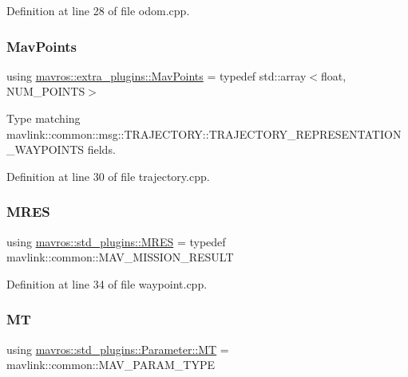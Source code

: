 Definition at line 28 of file odom.\+cpp.

\mbox{\label{group__plugin_gafae91f0662f199848c074fd4d2edd106}} 
\subsubsection{\texorpdfstring{MavPoints}{MavPoints}}
{\footnotesize\ttfamily using \mbox{\hyperlink{group__plugin_gafae91f0662f199848c074fd4d2edd106}{mavros\+::extra\+\_\+plugins\+::\+Mav\+Points}} = typedef std\+::array$<$float, N\+U\+M\+\_\+\+P\+O\+I\+N\+TS$>$}



Type matching mavlink\+::common\+::msg\+::\+T\+R\+A\+J\+E\+C\+T\+O\+R\+Y\+::\+T\+R\+A\+J\+E\+C\+T\+O\+R\+Y\+\_\+\+R\+E\+P\+R\+E\+S\+E\+N\+T\+A\+T\+I\+O\+N\+\_\+\+W\+A\+Y\+P\+O\+I\+N\+TS fields. 



Definition at line 30 of file trajectory.\+cpp.

\mbox{\label{group__plugin_ga70798af9f8bc5db9dd75d667d4488ae6}} 
\subsubsection{\texorpdfstring{MRES}{MRES}}
{\footnotesize\ttfamily using \mbox{\hyperlink{group__plugin_ga70798af9f8bc5db9dd75d667d4488ae6}{mavros\+::std\+\_\+plugins\+::\+M\+R\+ES}} = typedef mavlink\+::common\+::\+M\+A\+V\+\_\+\+M\+I\+S\+S\+I\+O\+N\+\_\+\+R\+E\+S\+U\+LT}



Definition at line 34 of file waypoint.\+cpp.

\mbox{\label{group__plugin_ga7d57778649dff1fd8c9aaf2599ff5238}} 
\subsubsection{\texorpdfstring{MT}{MT}}
{\footnotesize\ttfamily using \mbox{\hyperlink{group__plugin_ga7d57778649dff1fd8c9aaf2599ff5238}{mavros\+::std\+\_\+plugins\+::\+Parameter\+::\+MT}} =  mavlink\+::common\+::\+M\+A\+V\+\_\+\+P\+A\+R\+A\+M\+\_\+\+T\+Y\+PE}




